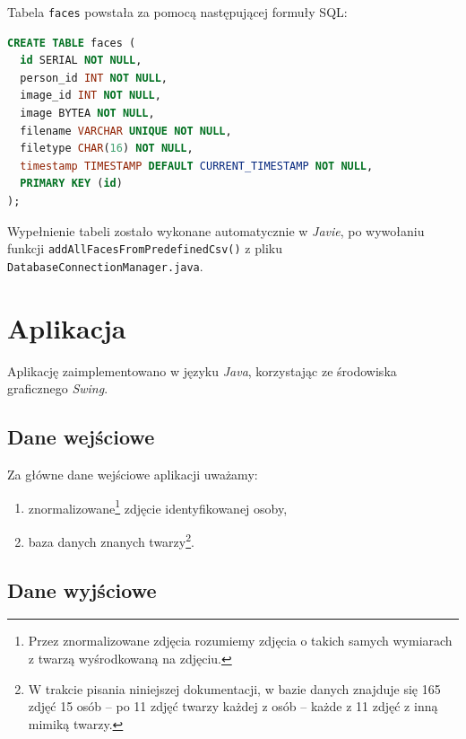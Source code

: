 \documentclass[a4paper,titlepage]{article}
\theoremstyle{break}
\numberwithin{equation}{subsection}
\begin{document}
Tabela \texttt{faces} powstała za pomocą następującej formuły SQL:
\begin{lstlisting}[language=SQL,frame=single]
CREATE TABLE faces (
  id SERIAL NOT NULL,
  person_id INT NOT NULL,
  image_id INT NOT NULL,
  image BYTEA NOT NULL,
  filename VARCHAR UNIQUE NOT NULL,
  filetype CHAR(16) NOT NULL,
  timestamp TIMESTAMP DEFAULT CURRENT_TIMESTAMP NOT NULL,
  PRIMARY KEY (id)
);
\end{lstlisting}
\begin{sloppypar}
Wypełnienie tabeli zostało wykonane automatycznie w \emph{Javie}, po wywołaniu funkcji \texttt{addAllFacesFromPredefinedCsv()} z pliku \texttt{DatabaseConnectionManager.java}.
\end{sloppypar}


\section{Aplikacja}
\label{sec:aplikacja}

Aplikację zaimplementowano w języku \emph{Java}, korzystając ze środowiska graficznego \emph{Swing}.


\subsection{Dane wejściowe}

Za główne dane wejściowe aplikacji uważamy:
\begin{enumerate}
	\item znormalizowane\footnote{Przez znormalizowane zdjęcia rozumiemy zdjęcia o takich samych wymiarach z twarzą wyśrodkowaną na zdjęciu.} zdjęcie identyfikowanej osoby,
	\item baza danych znanych twarzy\footnote{W trakcie pisania niniejszej dokumentacji, w bazie danych znajduje się 165 zdjęć 15 osób -- po 11 zdjęć twarzy każdej z osób -- każde z 11 zdjęć z inną mimiką twarzy.}.
\end{enumerate}


\subsection{Dane wyjściowe}
\end{document}
